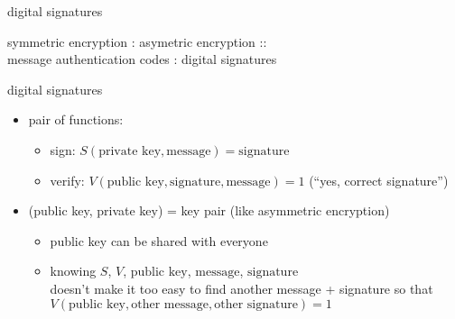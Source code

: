 \begin{frame}{digital signatures}

symmetric encryption : asymetric encryption :: \\
message authentication codes : digital signatures
\end{frame}

\begin{frame}{digital signatures}
    \begin{itemize}
    \item pair of functions:
        \begin{itemize}
        \item sign: $S(\text{private key}, \text{message}) = \text{signature}$
        \item verify: $V(\text{public key}, \text{signature}, \text{message}) = 1$ (``yes, correct signature'') 
        \end{itemize}
    \item (public key, private key) = key pair (like asymmetric encryption)
        \begin{itemize}
        \item public key can be shared with everyone
        \item knowing $S$, $V$, $\text{public key}$, $\text{message}$, $\text{signature}$ \\
            doesn't make it too easy to find another message + signature so that\\
            $V(\text{public key}, \text{other message}, \text{other signature}) = 1$
        \end{itemize}
    \end{itemize}
\end{frame}

